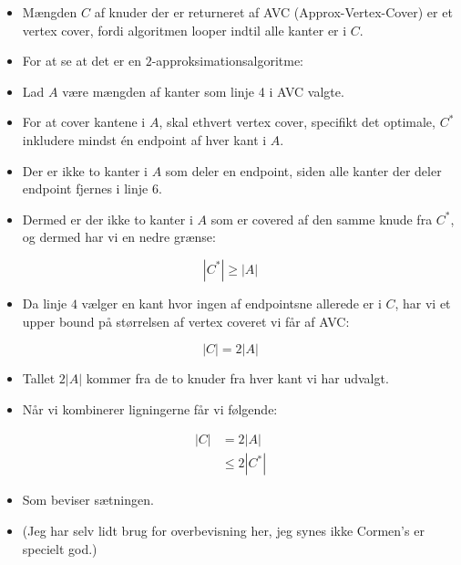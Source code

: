 \begin{frame}[allowframebreaks]
\begin{itemize}
		\item Mængden $C$ af knuder der er returneret af AVC (Approx-Vertex-Cover) er et vertex cover, fordi algoritmen looper indtil alle kanter er i $C$.
		\item For at se at det er en $2$-approksimationsalgoritme:
		\item Lad $A$ være mængden af kanter som linje 4 i AVC valgte.
		\item For at cover kantene i $A$, skal ethvert vertex cover, specifikt det optimale, $C^{*}$ inkludere mindst én endpoint af hver kant i $A$.
		\item Der er ikke to kanter i $A$ som deler en endpoint, siden alle kanter der deler endpoint fjernes i linje 6.
		\item Dermed er der ikke to kanter i $A$ som er covered af den samme knude fra $C^{*}$, og dermed har vi en nedre grænse:
	\end{itemize}
	\begin{equation}
		|C^{*}| \ge |A|
	\end{equation}
	\begin{itemize}
		\item Da linje $4$ vælger en kant hvor ingen af endpointsne allerede er i $C$, har vi et upper bound på størrelsen af vertex coveret vi får af AVC:
	\end{itemize}
	\begin{equation}
		|C| = 2|A|
	\end{equation}
	\begin{itemize}
		\item Tallet $2|A|$ kommer fra de to knuder fra hver kant vi har udvalgt.
		\item Når vi kombinerer ligningerne får vi følgende:
	\end{itemize}
	\begin{align*}
		|C| & = 2|A|       \\
		    & \le 2|C^{*}|
	\end{align*}
	\begin{itemize}
		\item Som beviser sætningen.
		\item (Jeg har selv lidt brug for overbevisning her, jeg synes ikke Cormen's er specielt god.)
	\end{itemize}
\end{frame}

